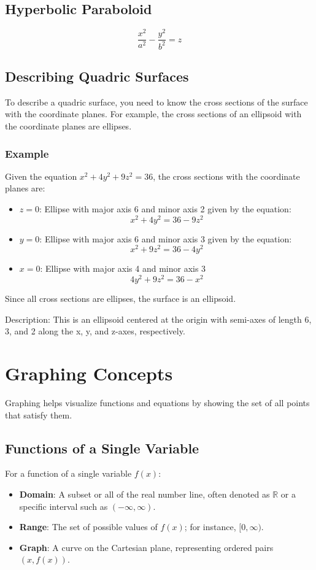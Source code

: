 \documentclass[a4paper,12pt,openany]{book}
\begin{document}
\subsection{Hyperbolic Paraboloid}
\begin{equation}
    \dfrac{x^2}{a^2} - \dfrac{y^2}{b^2} = z
\end{equation}

\subsection{Describing Quadric Surfaces}
To describe a quadric surface, you need to know the cross sections of the surface with the coordinate planes. For example, the cross sections of an ellipsoid with the coordinate planes are ellipses.
\subsubsection{Example}
Given the equation \(x^2 + 4y^2 + 9z^2 = 36\), the cross sections with the coordinate planes are:
\begin{itemize}
    \item{\(z = 0\): Ellipse with major axis 6 and minor axis 2 given by the equation:}
    \[
        x^2 + 4y^2 = 36-9z^2
    \]
    \item{\(y = 0\): Ellipse with major axis 6 and minor axis 3 given by the equation:}
    \[
        x^2 + 9z^2 = 36-4y^2
    \]
    \item{\(x = 0\): Ellipse with major axis 4 and minor axis 3}
    \[
        4y^2 + 9z^2 = 36-x^2
    \]
\end{itemize}
Since all cross sections are ellipses, the surface is an ellipsoid.

Description: This is an ellipsoid centered at the origin with semi-axes of length 6, 3, and 2 along the x, y, and z-axes, respectively.

\section{Graphing Concepts}

Graphing helps visualize functions and equations by showing the set of all points that satisfy them.

\subsection{Functions of a Single Variable}

For a function of a single variable \( f(x) \):
\begin{itemize}
    \item \textbf{Domain}: A subset or all of the real number line, often denoted as \(\mathbb{R}\) or a specific interval such as \((- \infty, \infty)\).
    \item \textbf{Range}: The set of possible values of \( f(x) \); for instance, \([0, \infty)\).
    \item \textbf{Graph}: A curve on the Cartesian plane, representing ordered pairs \((x, f(x))\).
\end{itemize}
\end{document}
